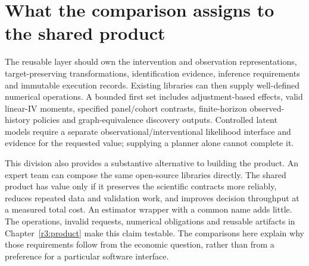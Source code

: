 \section{What the comparison assigns to the shared product}
\label{r3:software-composition}

The reusable layer should own the intervention and observation
representations, target-preserving transformations, identification evidence,
inference requirements and immutable execution records. Existing libraries
can then supply well-defined numerical operations. A bounded first set
includes adjustment-based effects, valid linear-IV moments, specified
panel/cohort contrasts, finite-horizon observed-history policies and
graph-equivalence discovery outputs. Controlled latent models require a
separate observational/interventional likelihood interface and evidence
for the requested value; supplying a planner alone cannot complete it.

This division also provides a substantive alternative to building the
product. An expert team can compose the same open-source libraries directly.
The shared product has value only if it preserves the scientific contracts
more reliably, reduces repeated data and validation work, and improves
decision throughput at a measured total cost. An estimator wrapper with
a common name adds little. The operations, invalid requests, numerical
obligations and reusable artifacts in Chapter~\ref{r3:product} make this
claim testable. The comparisons here explain why those requirements follow
from the economic question, rather than from a preference for a particular
software interface.

